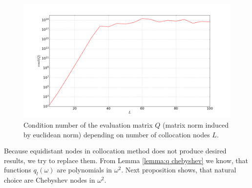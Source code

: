 \documentclass[a4paper,11pt,bibliography=totoc,listof=totoc,headinclude=true,cleardoublepage=empty,oneside]{scrbook}
\begin{document}
\begin{figure}
    \centering
    \includegraphics[width=1\linewidth]{latex//images//equi_coll/Figure_2.png}
    \caption{Condition number of the evaluation matrix $Q$ (matrix norm induced by euclidean norm) depending on number of collocation nodes $L$.}
    \label{fig:eq coll cond}
\end{figure}

Because equidistant nodes in collocation method does not produce desired results, we try to replace them. From Lemma \ref{lemma:q chebyshev} we know, that functions $q_l(\omega)$ are polynomials in $\omega^2$. Next proposition shows, that natural choice are Chebyshev nodes in $\omega^2$.
\end{document}
